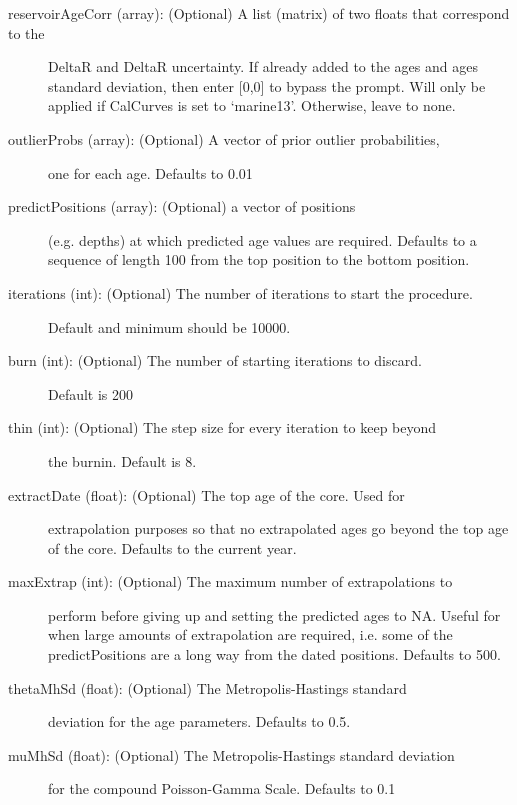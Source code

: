 \documentclass[letterpaper,10pt,english]{sphinxmanual}
\begin{document}
\begin{fulllineitems}
\begin{description}
\begin{description}
\item[{reservoirAgeCorr (array): (Optional) A list (matrix) of two floats that correspond to the}] \leavevmode
DeltaR and DeltaR uncertainty. If already added to the ages and
ages standard deviation, then enter {[}0,0{]} to bypass the prompt.
Will only be applied if CalCurves is set to ‘marine13’. Otherwise,
leave to none.

\item[{outlierProbs (array): (Optional) A vector of prior outlier probabilities,}] \leavevmode
one for each age. Defaults to 0.01

\item[{predictPositions (array): (Optional) a vector of positions }] \leavevmode
(e.g. depths) at which predicted age values are required. 
Defaults to a sequence of length 100 from the top position to the
bottom position.

\item[{iterations (int): (Optional) The number of iterations to start the procedure. }] \leavevmode
Default and minimum should be 10000.

\item[{burn (int): (Optional) The number of starting iterations to discard.}] \leavevmode
Default is 200

\item[{thin (int): (Optional) The step size for every iteration to keep beyond}] \leavevmode
the burnin. Default is 8.

\item[{extractDate (float): (Optional) The top age of the core. Used for}] \leavevmode
extrapolation purposes so that no extrapolated ages go beyond the
top age of the core. Defaults to the current year.

\item[{maxExtrap (int): (Optional) The maximum number of extrapolations to}] \leavevmode
perform before giving up and setting the predicted ages to NA. 
Useful for when large amounts of extrapolation are required, i.e.
some of the predictPositions are a long way from the dated
positions. Defaults to 500.

\item[{thetaMhSd (float):  (Optional)  The Metropolis-Hastings standard}] \leavevmode
deviation for the age parameters. Defaults to 0.5.

\item[{muMhSd (float): (Optional)  The Metropolis-Hastings standard deviation}] \leavevmode
for the compound Poisson-Gamma Scale. Defaults to 0.1


\end{description}
\end{description}
\end{fulllineitems}
\end{document}

